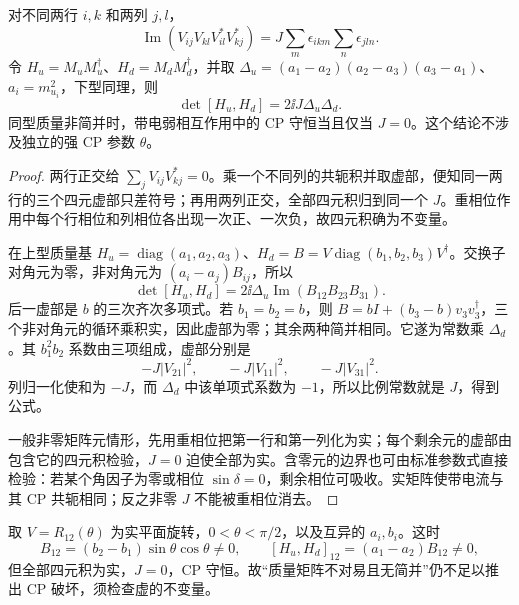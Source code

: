\begin{proposition}
对不同两行 $i,k$ 和两列 $j,l$，
\[
 \operatorname{Im}(V_{ij}V_{kl}V_{il}^*V_{kj}^*)
 =J\sum_m\epsilon_{ikm}\sum_n\epsilon_{jln}.
\]
令 $H_u=M_uM_u^\dagger$、$H_d=M_dM_d^\dagger$，并取
$\Delta_u=(a_1-a_2)(a_2-a_3)(a_3-a_1)$、$a_i=m_{u_i}^2$，下型同理，则
\begin{equation}
 \det[H_u,H_d]=2\ii J\Delta_u\Delta_d.
 \label{eq:jarlskog-commutator}
\end{equation}
同型质量非简并时，带电弱相互作用中的 CP 守恒当且仅当 $J=0$。这个结论不涉及独立的强 CP 参数 $\theta$。
\end{proposition}
\begin{proof}
两行正交给 $\sum_jV_{ij}V_{kj}^*=0$。乘一个不同列的共轭积并取虚部，便知同一两行的三个四元虚部只差符号；再用两列正交，全部四元积归到同一个 $J$。重相位作用中每个行相位和列相位各出现一次正、一次负，故四元积确为不变量。

在上型质量基 $H_u=\operatorname{diag}(a_1,a_2,a_3)$、$H_d=B=V\operatorname{diag}(b_1,b_2,b_3)V^\dagger$。交换子对角元为零，非对角元为 $(a_i-a_j)B_{ij}$，所以
\[
 \det[H_u,H_d]=2\ii\Delta_u\operatorname{Im}(B_{12}B_{23}B_{31}).
\]
后一虚部是 $b$ 的三次齐次多项式。若 $b_1=b_2=b$，则 $B=bI+(b_3-b)v_3v_3^\dagger$，三个非对角元的循环乘积实，因此虚部为零；其余两种简并相同。它遂为常数乘 $\Delta_d$。其 $b_1^2b_2$ 系数由三项组成，虚部分别是
\[
 -J|V_{21}|^2,\qquad -J|V_{11}|^2,\qquad -J|V_{31}|^2.
\]
列归一化使和为 $-J$，而 $\Delta_d$ 中该单项式系数为 $-1$，所以比例常数就是 $J$，得到公式。

一般非零矩阵元情形，先用重相位把第一行和第一列化为实；每个剩余元的虚部由包含它的四元积检验，$J=0$ 迫使全部为实。含零元的边界也可由标准参数式直接检验：若某个角因子为零或相位 $\sin\delta=0$，剩余相位可吸收。实矩阵使带电流与其 CP 共轭相同；反之非零 $J$ 不能被重相位消去。
\end{proof}

\begin{workedexample}[混合本身不等于 CP 破坏]
取 $V=R_{12}(\theta)$ 为实平面旋转，$0<\theta<\pi/2$，以及互异的 $a_i,b_i$。这时
\[
 B_{12}=(b_2-b_1)\sin\theta\cos\theta\ne0,
 \qquad [H_u,H_d]_{12}=(a_1-a_2)B_{12}\ne0,
\]
但全部四元积为实，$J=0$，CP 守恒。故“质量矩阵不对易且无简并”仍不足以推出 CP 破坏，须检查虚的不变量。
\end{workedexample}


